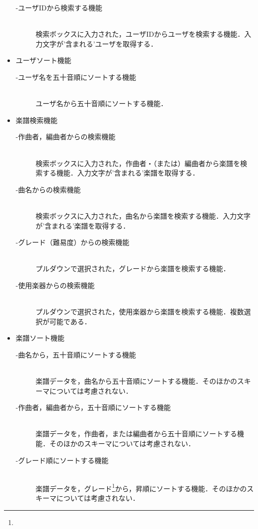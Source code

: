 \begin{itemize}
\begin{description}
        \item[-ユーザIDから検索する機能] \mbox{}\\
            検索ボックスに入力された，ユーザIDからユーザを検索する機能．入力文字が'含まれる'ユーザを取得する．
    \end{description}
    \item ユーザソート機能
    \begin{description}
        \item[-ユーザ名を五十音順にソートする機能] \mbox{}\\
            ユーザ名から五十音順にソートする機能．
    \end{description}
    \item 楽譜検索機能
    \begin{description}
        \item[-作曲者，編曲者からの検索機能]\mbox{}\\
            検索ボックスに入力された，作曲者・（または）編曲者から楽譜を検索する機能．入力文字が'含まれる'楽譜を取得する．
        \item[-曲名からの検索機能] \mbox{}\\
            検索ボックスに入力された，曲名から楽譜を検索する機能．入力文字が'含まれる'楽譜を取得する．
        \item[-グレード（難易度）からの検索機能] \mbox{}\\
            プルダウンで選択された，グレードから楽譜を検索する機能．
        \item[-使用楽器からの検索機能] \mbox{}\\
            プルダウンで選択された，使用楽器から楽譜を検索する機能．複数選択が可能である．
    \end{description}
    \item 楽譜ソート機能
    \begin{description}
        \item[-曲名から，五十音順にソートする機能]\mbox{}\\
            楽譜データを，曲名から五十音順にソートする機能．そのほかのスキーマについては考慮されない．
        \item[-作曲者，編曲者から，五十音順にソートする機能] \mbox{}\\
            楽譜データを，作曲者，または編曲者から五十音順にソートする機能．そのほかのスキーマについては考慮されない．
        \item[-グレード順にソートする機能] \mbox{}\\
            楽譜データを，グレード\footnote[1]{}から，昇順にソートする機能．そのほかのスキーマについては考慮されない．

\end{description}
\end{itemize}
